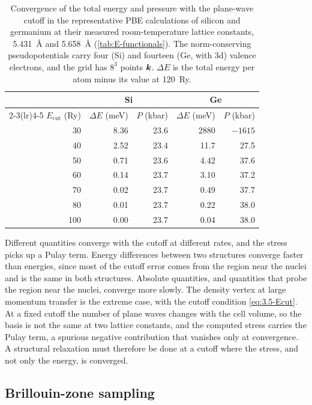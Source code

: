 \begin{table}[t]
  \centering
  \caption{Convergence of the total energy and pressure with the plane-wave cutoff in the representative PBE calculations of silicon and germanium at their measured room-temperature lattice constants, \SI{5.431}{\angstrom} and \SI{5.658}{\angstrom} (\cref{tab:E-functionals}). The norm-conserving pseudopotentials carry four (Si) and fourteen (Ge, with 3d) valence electrons, and the grid has $8^3$ points $\bm{k}$. $\Delta E$ is the total energy per atom minus its value at \SI{120}{Ry}.}
  \label{tab:E-cutoff}
  \begin{tabular}{r rr rr}
    \toprule
    & \multicolumn{2}{c}{Si} & \multicolumn{2}{c}{Ge} \\
    \cmidrule(lr){2-3}\cmidrule(lr){4-5}
    $E_{\mathrm{cut}}$ (Ry) & $\Delta E$ (meV) & $P$ (kbar) & $\Delta E$ (meV) & $P$ (kbar) \\
    \midrule
    30 & 8.36 & 23.6 & 2880 & $-1615$ \\
    40 & 2.52 & 23.4 & 11.7 & 27.5 \\
    50 & 0.71 & 23.6 & 4.42 & 37.6 \\
    60 & 0.14 & 23.7 & 3.10 & 37.2 \\
    70 & 0.02 & 23.7 & 0.49 & 37.7 \\
    80 & 0.01 & 23.7 & 0.22 & 38.0 \\
    100 & 0.00 & 23.7 & 0.04 & 38.0 \\
    \bottomrule
  \end{tabular}
\end{table}

Different quantities converge with the cutoff at different rates, and the stress picks up a Pulay term. Energy differences between two structures converge faster than energies, since most of the cutoff error comes from the region near the nuclei and is the same in both structures. Absolute quantities, and quantities that probe the region near the nuclei, converge more slowly. The density vertex at large momentum transfer is the extreme case, with the cutoff condition \cref{eq:3.5-Ecut}. At a fixed cutoff the number of plane waves changes with the cell volume, so the basis is not the same at two lattice constants, and the computed stress carries the Pulay term, a spurious negative contribution that vanishes only at convergence. A structural relaxation must therefore be done at a cutoff where the stress, and not only the energy, is converged.

\subsection{Brillouin-zone sampling}

